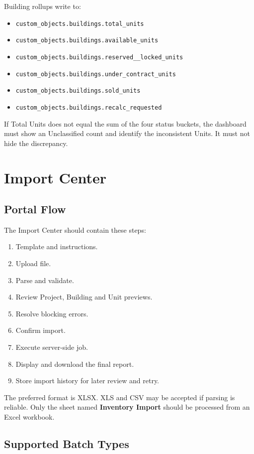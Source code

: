 \documentclass[10pt]{article}
\newcommand{\key}[1]{\texttt{\small #1}}
\begin{document}
Building rollups write to:
\begin{itemize}
\item \key{custom\_objects.buildings.total\_units}
\item \key{custom\_objects.buildings.available\_units}
\item \key{custom\_objects.buildings.reserved\_\_locked\_units}
\item \key{custom\_objects.buildings.under\_contract\_units}
\item \key{custom\_objects.buildings.sold\_units}
\item \key{custom\_objects.buildings.recalc\_requested}
\end{itemize}

If Total Units does not equal the sum of the four status buckets, the dashboard must show an Unclassified count and identify the inconsistent Units. It must not hide the discrepancy.

\section{Import Center}
\subsection{Portal Flow}
The Import Center should contain these steps:
\begin{enumerate}
\item Template and instructions.
\item Upload file.
\item Parse and validate.
\item Review Project, Building and Unit previews.
\item Resolve blocking errors.
\item Confirm import.
\item Execute server-side job.
\item Display and download the final report.
\item Store import history for later review and retry.
\end{enumerate}

The preferred format is XLSX. XLS and CSV may be accepted if parsing is reliable. Only the sheet named \textbf{Inventory Import} should be processed from an Excel workbook.

\subsection{Supported Batch Types}
\end{document}
